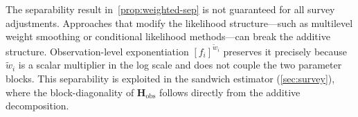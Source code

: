 \begin{remark}
\label{smc:rem-separability-significance}
  The separability result in~\cref{prop:weighted-sep} is not
  guaranteed for all survey adjustments.  Approaches that modify the
  likelihood structure---such as multilevel weight smoothing
  \citep{RabeHeskethSkrondal2006} or conditional likelihood
  methods---can break the additive structure.  Observation-level
  exponentiation $[f_i]^{\tilde{w}_i}$ preserves it precisely because
  $\tilde{w}_i$ is a scalar multiplier in the log scale and does
  not couple the two parameter blocks.  This separability is exploited
  in the sandwich estimator (\cref{sec:survey}), where the
  block-diagonality of $\mathbf{H}_{\mathrm{obs}}$ follows directly
  from the additive decomposition.
\end{remark}
